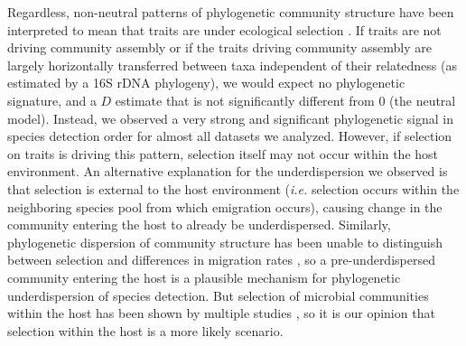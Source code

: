 \documentclass{article}
\begin{document}
Regardless, non-neutral patterns of phylogenetic community structure have been interpreted to mean that traits are under ecological selection \cite{Webb2000,Webb2002,CavenderBares2004,Gerhold2015}. If traits are not driving community assembly \cite{Hubbell2001} or if the traits driving community assembly are largely horizontally transferred between taxa independent of their relatedness (as estimated by a 16S rDNA phylogeny), we would expect no phylogenetic signature, and a \(D\) estimate that is not significantly different from 0 (the neutral model). Instead, we observed a very strong and significant phylogenetic signal in species detection order for almost all datasets we analyzed. However, if selection on traits is driving this pattern, selection itself may not occur within the host environment. An alternative explanation for the underdispersion we observed is that selection is external to the host environment (\emph{i.e.} selection occurs within the neighboring species pool from which emigration occurs), causing change in the community entering the host to already be underdispersed. Similarly, phylogenetic dispersion of community structure has been unable to distinguish between selection and differences in migration rates \cite{Emerson2008}, so a pre-underdispersed community entering the host is a plausible mechanism for phylogenetic underdispersion of species detection. But selection of microbial communities within the host has been shown by multiple studies \cite{Peterfreund2012,David2014,Kennedy2016}, so it is our opinion that selection within the host is a more likely scenario.
\par
\end{document}
